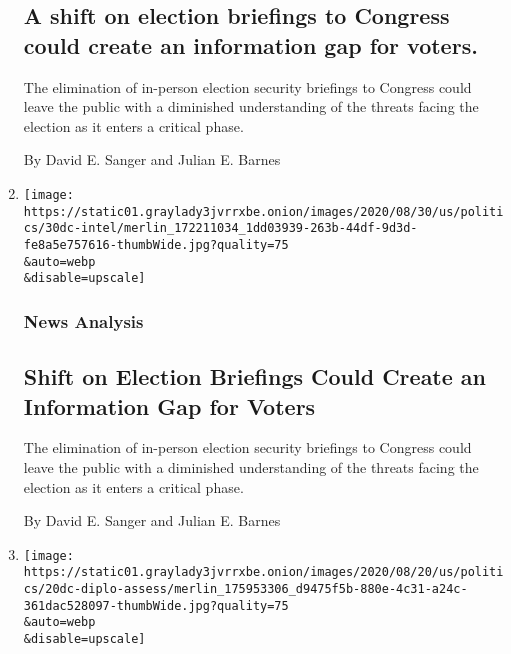 \begin{enumerate}
  \hypertarget{a-shift-on-election-briefings-to-congress-could-create-an-information-gap-for-voters}{%
  \subsection{A shift on election briefings to Congress could create an
  information gap for
  voters.}\label{a-shift-on-election-briefings-to-congress-could-create-an-information-gap-for-voters}}

  The elimination of in-person election security briefings to Congress
  could leave the public with a diminished understanding of the threats
  facing the election as it enters a critical phase.

  By David E. Sanger and Julian E. Barnes
\item
  \href{/2020/08/30/us/politics/2020-election-security-briefings.html}{}

  \texttt{[image: https://static01.graylady3jvrrxbe.onion/images/2020/08/30/us/politics/30dc-intel/merlin\_172211034\_1dd03939-263b-44df-9d3d-fe8a5e757616-thumbWide.jpg?quality=75\\\&auto=webp\\\&disable=upscale]}

  \hypertarget{news-analysis-1}{%
  \subsubsection{News Analysis}\label{news-analysis-1}}

  \hypertarget{shift-on-election-briefings-could-create-an-information-gap-for-voters}{%
  \subsection{Shift on Election Briefings Could Create an Information
  Gap for
  Voters}\label{shift-on-election-briefings-could-create-an-information-gap-for-voters}}

  The elimination of in-person election security briefings to Congress
  could leave the public with a diminished understanding of the threats
  facing the election as it enters a critical phase.

  By David E. Sanger and Julian E. Barnes
\item
  \href{/2020/08/20/us/politics/trump-iran-nuclear-deal.html}{}

  \texttt{[image: https://static01.graylady3jvrrxbe.onion/images/2020/08/20/us/politics/20dc-diplo-assess/merlin\_175953306\_d9475f5b-880e-4c31-a24c-361dac528097-thumbWide.jpg?quality=75\\\&auto=webp\\\&disable=upscale]}


\end{enumerate}
